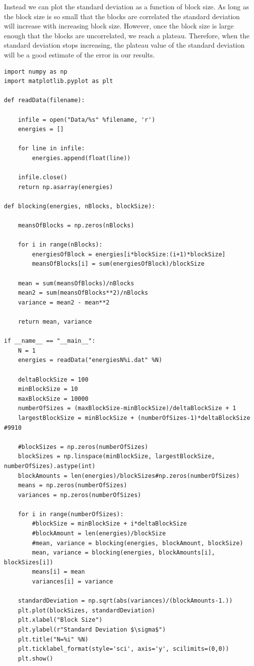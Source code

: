 \documentclass[../main.tex]{subfiles}
\begin{document}
Instead we can plot the standard deviation as a function of block size. As long as the block size is so small that the blocks are correlated the standard deviation will increase with increasing block size. However, once the block size is large enough that the blocks are uncorrelated, we reach a plateau. Therefore, when the standard deviation stops increasing, the plateau value of the standard deviation will be a good estimate of the error in our results.

\lstset{language=Python}
\begin{lstlisting}[title={Blocking in Python}]
import numpy as np
import matplotlib.pyplot as plt

def readData(filename):
    
    infile = open("Data/%s" %filename, 'r')
    energies = []
    
    for line in infile:
        energies.append(float(line))
    
    infile.close()
    return np.asarray(energies)
    
def blocking(energies, nBlocks, blockSize):
    
    meansOfBlocks = np.zeros(nBlocks)
    
    for i in range(nBlocks):
        energiesOfBlock = energies[i*blockSize:(i+1)*blockSize]
        meansOfBlocks[i] = sum(energiesOfBlock)/blockSize
    
    mean = sum(meansOfBlocks)/nBlocks
    mean2 = sum(meansOfBlocks**2)/nBlocks
    variance = mean2 - mean**2
    
    return mean, variance
    
if __name__ == "__main__":
    N = 1
    energies = readData("energiesN%i.dat" %N)
    
    deltaBlockSize = 100
    minBlockSize = 10
    maxBlockSize = 10000
    numberOfSizes = (maxBlockSize-minBlockSize)/deltaBlockSize + 1
    largestBlockSize = minBlockSize + (numberOfSizes-1)*deltaBlockSize #9910
    
    #blockSizes = np.zeros(numberOfSizes)
    blockSizes = np.linspace(minBlockSize, largestBlockSize, numberOfSizes).astype(int)
    blockAmounts = len(energies)/blockSizes#np.zeros(numberOfSizes)
    means = np.zeros(numberOfSizes)
    variances = np.zeros(numberOfSizes)
    
    for i in range(numberOfSizes):
        #blockSize = minBlockSize + i*deltaBlockSize
        #blockAmount = len(energies)/blockSize
        #mean, variance = blocking(energies, blockAmount, blockSize)
        mean, variance = blocking(energies, blockAmounts[i], blockSizes[i])
        means[i] = mean
        variances[i] = variance
    
    standardDeviation = np.sqrt(abs(variances)/(blockAmounts-1.))
    plt.plot(blockSizes, standardDeviation)
    plt.xlabel("Block Size")
    plt.ylabel(r"Standard Deviation $\sigma$")
    plt.title("N=%i" %N)
    plt.ticklabel_format(style='sci', axis='y', scilimits=(0,0))
    plt.show()
\end{lstlisting}
\end{document}
